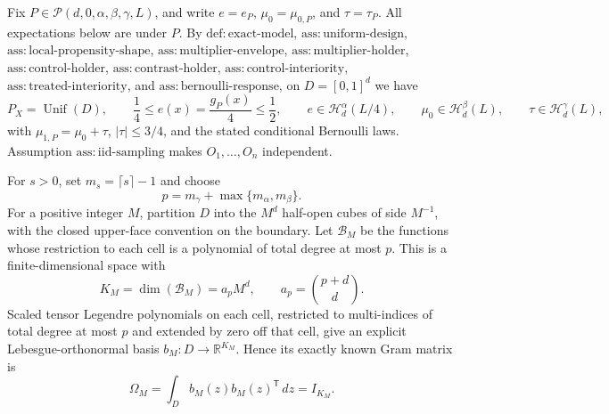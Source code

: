 Fix \(P\in\mathcal P(d,0,\alpha,\beta,\gamma,L)\), and write \(e=e_P\), \(\mu_0=\mu_{0,P}\), and \(\tau=\tau_P\).  All expectations below are under \(P\).  By \(\mathrm{def:exact\mbox{-}model}\), \(\mathrm{ass:uniform\mbox{-}design}\), \(\mathrm{ass:local\mbox{-}propensity\mbox{-}shape}\), \(\mathrm{ass:multiplier\mbox{-}envelope}\), \(\mathrm{ass:multiplier\mbox{-}holder}\), \(\mathrm{ass:control\mbox{-}holder}\), \(\mathrm{ass:contrast\mbox{-}holder}\), \(\mathrm{ass:control\mbox{-}interiority}\), \(\mathrm{ass:treated\mbox{-}interiority}\), and \(\mathrm{ass:bernoulli\mbox{-}response}\), on \(D=[0,1]^d\) we have
\[
 P_X=\operatorname{Unif}(D),\qquad
 \frac14\leq e(x)=\frac{g_P(x)}4\leq\frac12,
 \qquad e\in\mathcal H_d^\alpha(L/4),
 \qquad \mu_0\in\mathcal H_d^\beta(L),
 \qquad \tau\in\mathcal H_d^\gamma(L),
 \tag{1}
\]
with \(\mu_{1,P}=\mu_0+\tau\), \(|\tau|\leq3/4\), and the stated conditional Bernoulli laws.  Assumption \(\mathrm{ass:iid\mbox{-}sampling}\) makes \(O_1,\ldots,O_n\) independent.

For \(s>0\), set \(m_s=\lceil s\rceil-1\) and choose
\[
 p=m_\gamma+\max\{m_\alpha,m_\beta\}.
\]
For a positive integer \(M\), partition \(D\) into the \(M^d\) half-open cubes of side \(M^{-1}\), with the closed upper-face convention on the boundary.  Let \(\mathcal B_M\) be the functions whose restriction to each cell is a polynomial of total degree at most \(p\).  This is a finite-dimensional space with
\[
 K_M=\dim(\mathcal B_M)=a_pM^d,
 \qquad a_p=\binom{p+d}{d}.
 \tag{2}
\]
Scaled tensor Legendre polynomials on each cell, restricted to multi-indices of total degree at most \(p\) and extended by zero off that cell, give an explicit Lebesgue-orthonormal basis \(b_M:D\to\mathbb R^{K_M}\).  Hence its exactly known Gram matrix is
\[
 \Omega_M=\int_D b_M(z)b_M(z)^{\mathsf T}\,dz=I_{K_M}.
 \tag{3}
\]


